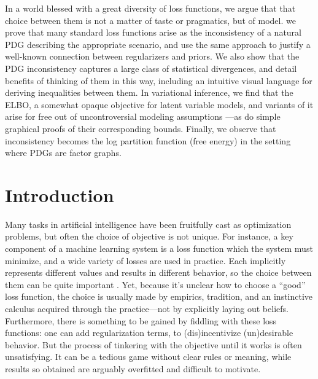 \label{chap:one-true-loss}

In a world blessed with a great diversity of loss functions,
we argue that that choice between them is not a matter of taste or pragmatics, but of model.
%
we prove that many standard loss functions arise as the inconsistency of
a natural PDG describing the appropriate scenario, and use the same approach to justify a well-known
	connection between regularizers and priors.
We also show that the PDG inconsistency captures a
large class of statistical divergences, and detail benefits of
thinking of them in this way, including an intuitive
visual language for deriving inequalities between them.
In variational inference, we find
that the ELBO, a somewhat opaque objective for latent variable
models, and variants of it
arise for free out of uncontroversial modeling assumptions%
---as do simple graphical proofs of their corresponding bounds.
Finally, we observe that inconsistency becomes the log partition function (free energy) in the setting where PDGs are factor graphs.

\section{Introduction}
Many tasks in artificial intelligence have been fruitfully cast as optimization problems, but often the choice of objective is not unique.
For instance, a key component of a machine learning system is a loss
function which the system must minimize,
and a wide variety of losses are used in practice.
Each implicitly represents different values and results in different
behavior, so the choice between them can be quite important
\parencite{wang2020comprehensive,jadon2020survey}.
Yet,
because it's unclear how to choose a ``good'' loss function,
the choice is usually made by empirics, tradition, and an instinctive calculus acquired through the practice---not by explicitly laying out beliefs.
Furthermore, there is something to be gained by fiddling with these
loss functions: one can add regularization terms, to (dis)incentivize
(un)desirable behavior.
But the process of tinkering with the objective until it works is often unsatisfying.
It can be a tedious game without clear rules or meaning,
 while results so obtained are arguably overfitted and difficult to motivate.


